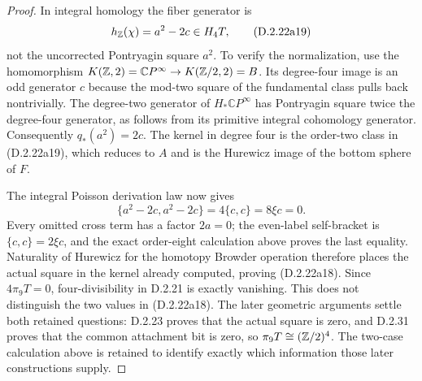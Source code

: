 \begin{proof}
In integral homology the fiber generator is
\[
 h_{\mathbb Z}(\chi)=a^2-2c\in H_4T,
 \tag{D.2.22a19}
\]
not the uncorrected Pontryagin square $a^2$.
To verify the normalization, use the homomorphism
$K(\mathbb Z,2)=\mathbb CP^\infty\to K(\mathbb Z/2,2)=B$.
Its degree-four image is an odd generator $c$ because the
mod-two square of the fundamental class pulls back nontrivially.
The degree-two generator of $H_*\mathbb CP^\infty$ has
Pontryagin square twice the degree-four generator, as follows
from its primitive integral cohomology generator.
Consequently $q_*(a^2)=2c$. The kernel in degree four is
the order-two class in \textup{(D.2.22a19)}, which reduces to
$A$ and is the Hurewicz image of the bottom sphere of $F$.

The integral Poisson derivation law now gives
\[
 \{a^2-2c,a^2-2c\}=4\{c,c\}=8\xi c=0.
 \tag{D.2.22a20}
\]
Every omitted cross term has a factor $2a=0$; the even-label
self-bracket is $\{c,c\}=2\xi c$, and the exact order-eight
calculation above proves the last equality.
Naturality of Hurewicz for the homotopy Browder operation
therefore places the actual square in the kernel already
computed, proving \textup{(D.2.22a18)}. Since $4\pi_9T=0$,
four-divisibility in \textup{D.2.21} is exactly vanishing.
This does not distinguish the two values in
\textup{(D.2.22a18)}. The later geometric arguments settle
both retained questions: \textup{D.2.23} proves that the actual
square is zero, and \textup{D.2.31} proves that the common
attachment bit is zero, so $\pi_9T\cong(\mathbb Z/2)^4$.
The two-case calculation above is retained to identify exactly
which information those later constructions supply.
\end{proof}
